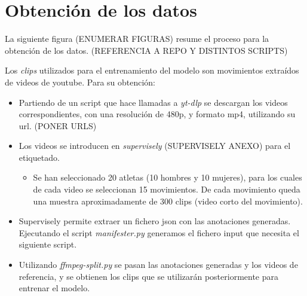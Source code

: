 \chapter{Obtención de los datos}

La siguiente figura (ENUMERAR FIGURAS) resume el proceso para la obtención de los datos. (REFERENCIA A REPO Y DISTINTOS SCRIPTS)

Los \textit{clips} utilizados para el entrenamiento del modelo son movimientos extraídos de videos de youtube. Para su obtención:

\begin{itemize}

\item Partiendo de un script que hace llamadas a \textit{yt-dlp} se descargan los videos correspondientes, con una resolución de 480p, y formato mp4, utilizando su url. (PONER URLS)

\item Los videos se introducen en \textit{supervisely} (SUPERVISELY ANEXO) para el etiquetado.

\begin{itemize}
\item Se han seleccionado 20 atletas (10 hombres y 10 mujeres), para los cuales de cada video se seleccionan 15 movimientos. De cada movimiento queda una muestra aproximadamente de 300 clips (video corto del movimiento).

\end{itemize}

\item Supervisely permite extraer un fichero json con las anotaciones generadas. Ejecutando el script \textit{manifester.py} generamos el fichero input que necesita el siguiente script.

\item Utilizando \textit{ffmpeg-split.py} se pasan las anotaciones generadas y los videos de referencia, y se obtienen los clips que se utilizarán posteriormente para entrenar el modelo.

\end{itemize}



